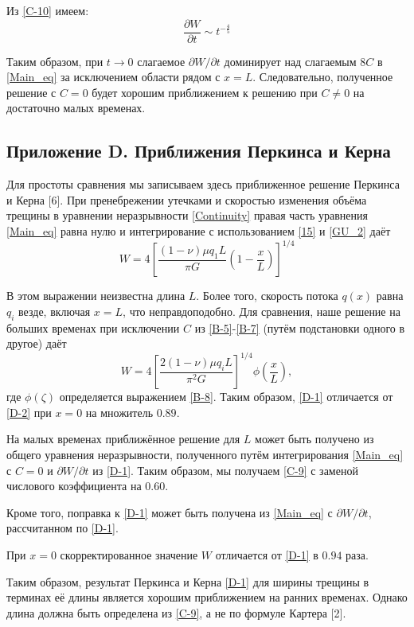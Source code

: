 \documentclass[a4paper, 11pt]{article}
\newcommand{\beq}{\begin{equation}}
\newcommand{\eeq}{\end{equation}}
\begin{document}
Из \eqref{C-10} имеем:
\beq\label{C-11}
\frac{\partial W}{\partial t}\sim t^{-\frac{4}{5}}
\tag{C-11}
\eeq

Таким образом, при $t\to0$ слагаемое $\partial W/\partial t$ доминирует над слагаемым $8C$ в \eqref{Main_eq} за исключением области рядом с $x=L$.
Следовательно, полученное решение с $C=0$ будет хорошим приближением к решению при $C\neq 0$ на достаточно малых временах.

\subsection{Приложение D. Приближения Перкинса и Керна}

Для простоты сравнения мы записываем здесь приближенное решение Перкинса и Керна [6].
При пренебрежении утечками и скоростью изменения объёма трещины в уравнении неразрывности \eqref{Continuity} правая часть уравнения \eqref{Main_eq} равна нулю и интегрирование с использованием \eqref{15} и \eqref{GU_2} даёт
\beq\label{D-1}
W=4\left[\frac{(1-\nu)\mu q_1L}{\pi G}\left(1-\frac{x}{L}\right)\right]^{1/4}
\tag{D-1}
\eeq

В этом выражении неизвестна длина $L$.
Более того, скорость потока $q(x)$ равна $q_i$ везде, включая $x=L$, что неправдоподобно.
Для сравнения, наше решение на больших временах при исключении $C$ из \eqref{B-5}-\eqref{B-7} (путём подстановки одного в другое) даёт
\beq\label{D-2}
W=4\left[\frac{2(1-\nu)\mu q_iL}{\pi^2G}\right]^{1/4}\phi\left(\frac{x}{L}\right),
\tag{D-2}
\eeq
где $\phi(\zeta)$ определяется выражением \eqref{B-8}.
Таким образом, \eqref{D-1} отличается от \eqref{D-2} при $x=0$ на множитель $0.89$.

На малых временах приближённое решение для $L$ может быть получено из общего уравнения неразрывности, полученного путём интегрирования \eqref{Main_eq} с $C=0$ и $\partial W/\partial t$ из \eqref{D-1}.
Таким образом, мы получаем \eqref{C-9} с заменой числового коэффициента на $0.60$.

Кроме того, поправка к \eqref{D-1} может быть получена из \eqref{Main_eq} с $\partial W/\partial t$, рассчитанном по \eqref{D-1}.

При $x=0$ скорректированное значение $W$ отличается от \eqref{D-1} в $0.94$ раза.

Таким образом, результат Перкинса и Керна \eqref{D-1} для ширины трещины в терминах её длины является хорошим приближением на ранних временах.
Однако длина должна быть определена из \eqref{C-9}, а не по формуле Картера [2].
\end{document}
